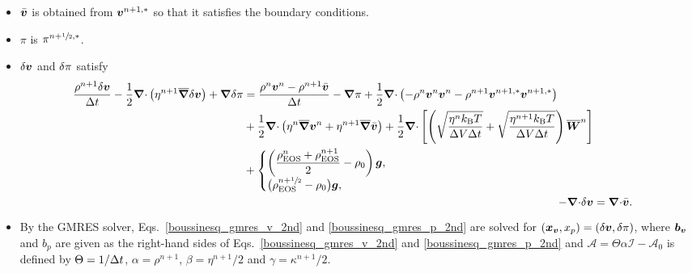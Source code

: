 \documentclass[
10pt
showpacs, showkeys,
amsmath,amssymb,
aps,
pre,
floatfix,
]{revtex4-1}
\newcommand{\divg}{{\V\nabla\cdot}}                       %
\begin{document}
\begin{enumerate}
\begin{itemize}
\item $\bar{\boldsymbol{v}}$ is obtained from $\boldsymbol{v}^{n+1,*}$ so that it satisfies the boundary conditions.
\item $\pi$ is $\pi^{n+\sfrac{1}{2},*}$.
\item $\delta\boldsymbol{v}$ and $\delta\pi$ satisfy
\begin{align}
\label{boussinesq_gmres_v_2nd}
\begin{split}
\frac{\rho^{n+1}\d{\V{v}}}{\D{t}} - \frac{1}{2}\divg\left(\eta^{n+1}\overline{\grad}\d{\V{v}}\right) + \grad\d{\pi}
& = \frac{\rho^n\V{v}^n-\rho^{n+1}\bar{\V{v}}}{\D{t}} - \grad\pi 
+ \frac{1}{2}\divg\left(-\rho^n\V{v}^n\V{v}^n-\rho^{n+1}\V{v}^{n+1,*}\V{v}^{n+1,*}\right) \\
& + \frac{1}{2}\divg\left( \eta^n\overline{\grad}\V{v}^n + \eta^{n+1}\overline{\grad}\bar{\V{v}} \right) 
+ \frac{1}{2}\divg\left[\left( \sqrt{\frac{\eta^n k_\mathrm{B}T}{\D{V}\D{t}}} + \sqrt{\frac{\eta^{n+1} k_\mathrm{B}T}{\D{V}\D{t}}} \right) \overline{\V{W}}^n \right] \\
& +
\begin{cases}
\displaystyle \left(\frac{\rho^n_\mathrm{EOS}+\rho^{n+1}_\mathrm{EOS}}{2}-\rho_0\right)\V{g}, \\
\big(\rho^{n+\myhalf}_\mathrm{EOS}-\rho_0\big)\V{g}, 
\end{cases}
\end{split} \\
\label{boussinesq_gmres_p_2nd}
-\divg\d{\V{v}} &= \divg\bar{\V{v}}.
\end{align}
\item By the GMRES solver, Eqs.~\eqref{boussinesq_gmres_v_2nd} and \eqref{boussinesq_gmres_p_2nd} are solved for $(\boldsymbol{x}_{\boldsymbol{v}},x_p)=(\delta\boldsymbol{v},\delta\pi)$, where $\boldsymbol{b}_{\boldsymbol{v}}$ and $b_p$ are given as the right-hand sides of Eqs.~\eqref{boussinesq_gmres_v_2nd} and \eqref{boussinesq_gmres_p_2nd} and $\mathcal{A}=\Theta\alpha\mathcal{I}-\mathcal{A}_0$ is defined by $\Theta=1/\Delta t$, $\alpha=\rho^{n+1}$, $\beta=\eta^{n+1}/2$ and $\gamma=\kappa^{n+1}/2$.
\end{itemize}

\end{enumerate}
\end{document}
